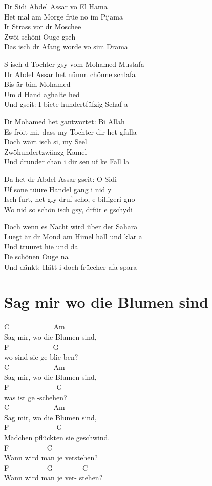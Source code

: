 \documentclass[
  letterpaper,
  twoside=false]{scrbook}
\begin{document}
Dr Sidi Abdel Assar vo El Hama\\
Het mal am Morge früe no im Pijama\\
Ir Strass vor dr Moschee\\
Zwöi schöni Ouge gseh\\
Das isch dr Afang worde vo sim Drama

S isch d Tochter gsy vom Mohamed Mustafa\\
Dr Abdel Assar het nümm chönne schlafa\\
Bis är bim Mohamed\\
Um d Hand aghalte hed\\
Und gseit: I biete hundertfüfzig Schaf a

Dr Mohamed het gantwortet: Bi Allah\\
Es fröit mi, dass my Tochter dir het gfalla\\
Doch wärt isch si, my Seel\\
Zwöhundertzwänzg Kamel\\
Und drunder chan i dir sen uf ke Fall la

Da het dr Abdel Assar gseit: O Sidi\\
Uf sone tüüre Handel gang i nid y\\
Isch furt, het gly druf scho, e billigeri gno\\
Wo nid so schön isch gsy, drfür e gschydi

Doch wenn es Nacht wird über der Sahara\\
Luegt är dr Mond am Himel häll und klar a\\
Und truuret hie und da\\
De schönen Ouge na\\
Und dänkt: Hätt i doch früecher afa spara

\hypertarget{sag-mir-wo-die-blumen-sind}{%
\chapter{Sag mir wo die Blumen sind}\label{sag-mir-wo-die-blumen-sind}}

C ~ ~ ~ ~ ~ ~ ~ Am ~ ~ ~ ~ ~\\
Sag mir, wo die Blumen sind,\\
F ~ ~ ~ ~ ~ ~ ~ G\\
wo sind sie ge-blie-ben?\\
C ~ ~ ~ ~ ~ ~ ~ Am ~ ~ ~ ~ ~\\
Sag mir, wo die Blumen sind,\\
F ~ ~ ~ ~ ~ ~ ~ ~G\\
was ist ge -schehen?\\
C ~ ~ ~ ~ ~ ~ ~ Am ~ ~ ~ ~ ~\\
Sag mir, wo die Blumen sind,\\
F ~ ~ ~ ~ ~ ~ ~ ~G\\
Mädchen pflückten sie geschwind.\\
F ~ ~ ~ ~ ~ ~ C ~ ~ ~ ~ ~ ~ ~ ~\\
Wann wird man je verstehen? ~ ~\\
F ~ ~ ~ ~ ~ ~ G ~ ~ ~ ~ ~C\\
Wann wird man je ver- stehen?
\end{document}
